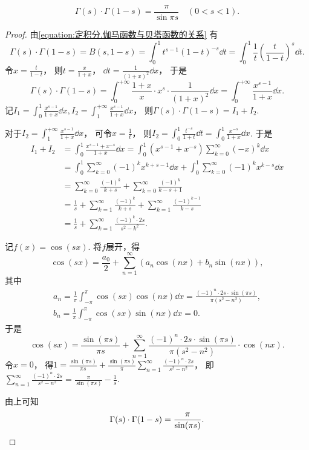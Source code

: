 \begin{property}[余元公式]
\begin{equation}\label{equation:定积分.余元公式}
	\Gamma(s) \cdot \Gamma(1-s)
	= \frac{\pi}{\sin{\pi s}} \quad (0 < s < 1).
\end{equation}
\begin{proof}
由\cref{equation:定积分.伽马函数与贝塔函数的关系} 有\[
	\Gamma(s) \cdot \Gamma(1-s)
	= B(s,1-s)
	= \int_0^1 t^{s-1} (1-t)^{-s} \dd{t}
	= \int_0^1 \frac1t \left(\frac{t}{1-t}\right)^s \dd{t}.
\]
令\(x=\frac{t}{1-t}\)，
则\(t=\frac{x}{1+x}\)，
\(\dd{t}=\frac1{(1+x)^2} \dd{x}\)，
于是\[
	\Gamma(s) \cdot \Gamma(1-s)
	= \int_0^{+\infty} \frac{1+x}{x} \cdot x^s \cdot \frac1{(1+x)^2} \dd{x}
	= \int_0^{+\infty} \frac{x^{s-1}}{1+x} \dd{x}.
\]
记\(I_1 = \int_0^1 \frac{x^{s-1}}{1+x} \dd{x},
I_2 = \int_1^{+\infty} \frac{x^{s-1}}{1+x} \dd{x}\)，
则\(\Gamma(s) \cdot \Gamma(1-s) = I_1 + I_2\).

对于\(I_2 = \int_1^{+\infty} \frac{x^{s-1}}{1+x} \dd{x}\)，
可令\(x = \frac1t\)，
则\(I_2
= \int_0^1 \frac{t^{-s}}{1+t} \dd{t}
= \int_0^1 \frac{x^{-s}}{1+x} \dd{x}\).
于是\begin{align*}
	I_1 + I_2
	&= \int_0^1 \frac{x^{s-1} + x^{-s}}{1+x} \dd{x}
	= \int_0^1 (x^{s-1} + x^{-s}) \sum_{k=0}^\infty (-x)^k \dd{x} \\%
	&= \int_0^1 \sum_{k=0}^\infty (-1)^k x^{k+s-1} \dd{x}
	+ \int_0^1 \sum_{k=0}^\infty (-1)^k x^{k-s} \dd{x} \\
	&= \sum_{k=0}^\infty \frac{(-1)^k}{k+s}
	+ \sum_{k=0}^\infty \frac{(-1)^k}{k-s+1} \\
	&= \frac1s
	+ \sum_{k=1}^\infty \frac{(-1)^k}{k+s}
	+ \sum_{k=1}^\infty \frac{(-1)^{k-1}}{k-s} \\
	&= \frac1s + \sum_{k=1}^\infty \frac{(-1)^k \cdot 2s}{s^2-k^2}.
\end{align*}

记\(f(x)=\cos(sx)\).
将\(f\)展开，得\[
	\cos(sx) = \frac{a_0}2 + \sum_{n=1}^\infty (a_n \cos(nx) + b_n \sin(nx)),
\]
其中\begin{gather*}
	a_n = \frac1\pi \int_{-\pi}^\pi \cos(sx) \cos(nx) \dd{x}
	= \frac{(-1)^n \cdot 2s \cdot \sin(\pi s)}{\pi(s^2-n^2)}, \\
	b_n = \frac1\pi \int_{-\pi}^\pi \cos(sx) \sin(nx) \dd{x} = 0.
\end{gather*}
于是\[
	\cos(sx) = \frac{\sin(\pi s)}{\pi s}
	+ \sum_{n=1}^\infty \frac{(-1)^n \cdot 2s \cdot \sin(\pi s)}{\pi(s^2-n^2)} \cdot \cos(nx).
\]
令\(x=0\)，
得\(1 = \frac{\sin(\pi s)}{\pi s}
+ \frac{\sin(\pi s)}{\pi} \sum_{n=1}^\infty \frac{(-1)^n \cdot 2s}{s^2-n^2}\)，
即\(\sum_{n=1}^\infty \frac{(-1)^n \cdot 2s}{s^2-n^2} = \frac{\pi}{\sin(\pi s)} - \frac1s\).

由上可知\[
	\Gamma(s) \cdot \Gamma(1-s)
	= \frac{\pi}{\sin(\pi s)}.
	\qedhere
\]
\end{proof}
\end{property}

